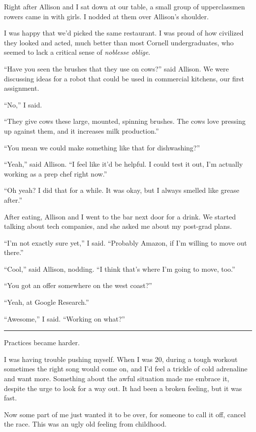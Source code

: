 Right after Allison and I sat down at our table, a small group of upperclassmen
rowers came in with girls.  I nodded at them over Allison's shoulder.  

I was happy that we'd picked the same restaurant.  I was proud of how civilized
they looked and acted, much better than most Cornell undergraduates, who seemed
to lack a critical sense of \textit{noblesse oblige}.

``Have you seen the brushes that they use on cows?'' said Allison.  We were
discussing ideas for a robot that could be used in commercial kitchens, our
first assignment.

``No,'' I said.

``They give cows these large, mounted, spinning brushes. The cows love pressing
up against them, and it increases milk production.'' 

``You mean we could make something like that for dishwashing?''

``Yeah,'' said Allison.  ``I feel like it'd be helpful.  I could test it out,
I'm actually working as a prep chef right now.''

``Oh yeah?  I did that for a while.  It was okay, but I always smelled like
grease after.''

After eating, Allison and I went to the bar next door for a drink.  We started
talking about tech companies, and she asked me about my post-grad plans.  

``I'm not exactly sure yet,'' I said.  ``Probably Amazon, if I'm willing to move
out there.''

``Cool,'' said Allison, nodding.  ``I think that's where I'm going to move,
too.''

``You got an offer somewhere on the west coast?''

``Yeah, at Google Research.''

``Awesome,'' I said.  ``Working on what?''

\plainfancybreak{12pt}{2}{* * *}

Practices became harder.

I was having trouble pushing myself.  When I was 20, during a tough workout
sometimes the right song would come on, and I'd feel a trickle of cold
adrenaline and want more.  Something about the awful situation made me embrace
it, despite the urge to look for a way out.  It had been a broken feeling, but
it was fast.

Now some part of me just wanted it to be over, for someone to call it off,
cancel the race.  This was an ugly old feeling from childhood.

